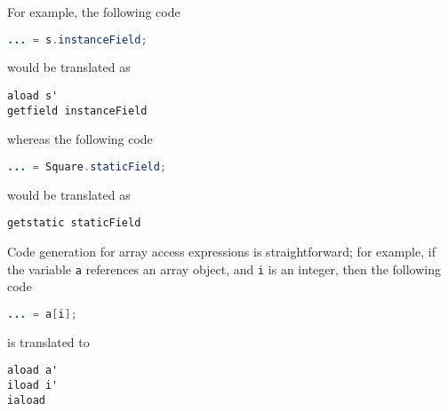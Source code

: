 \documentclass[8pt,a4paper,compress]{beamer}
\begin{document}
\begin{frame}[fragile]
\pause

For example, the following code

\smallskip

\begin{lstlisting}[language=Java,style=focusin]
... = s.instanceField;
\end{lstlisting}

\smallskip

would be translated as

\smallskip

\begin{lstlisting}[language={},style=focusin]
aload s'
getfield instanceField
\end{lstlisting}

\smallskip

whereas the following code
\begin{lstlisting}[language=Java,style=focusin]
... = Square.staticField;
\end{lstlisting}

\smallskip

would be translated as

\smallskip

\begin{lstlisting}[language={},style=focusin]
getstatic staticField
\end{lstlisting}

\pause
\bigskip

Code generation for array access expressions is straightforward; for example, if the variable \lstinline{a} references an array object, and \lstinline{i} is an integer, then the following code

\smallskip

\begin{lstlisting}[language=Java,style=focusin]
... = a[i];
\end{lstlisting}

\smallskip

is translated to 

\smallskip

\begin{lstlisting}[language={},style=focusin]
aload a'
iload i'
iaload
\end{lstlisting}
\end{frame}
\end{document}
